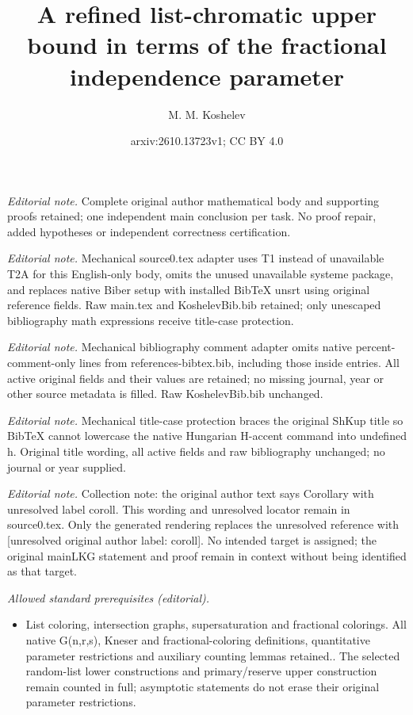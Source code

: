 \documentclass[10pt,a4paper]{article}
\title{A refined list-chromatic upper bound in terms of the fractional independence parameter}
\author{M. M. Koshelev}
\date{arxiv:2610.13723v1; CC BY 4.0}
\theoremstyle{remark}
\theoremstyle{definition}
\begin{document}
\maketitle
\noindent\textit{Editorial note.} Complete original author mathematical body and supporting proofs retained; one independent main conclusion per task. No proof repair, added hypotheses or independent correctness certification.\par\medskip
\noindent\textit{Editorial note.} Mechanical source0.tex adapter uses T1 instead of unavailable T2A for this English-only body, omits the unused unavailable systeme package, and replaces native Biber setup with installed BibTeX unsrt using original reference fields. Raw main.tex and KoshelevBib.bib retained; only unescaped bibliography math expressions receive title-case protection.\par\medskip
\noindent\textit{Editorial note.} Mechanical bibliography comment adapter omits native percent-comment-only lines from references-bibtex.bib, including those inside entries. All active original fields and their values are retained; no missing journal, year or other source metadata is filled. Raw KoshelevBib.bib unchanged.\par\medskip
\noindent\textit{Editorial note.} Mechanical title-case protection braces the original ShKup title so BibTeX cannot lowercase the native Hungarian H-accent command into undefined h. Original title wording, all active fields and raw bibliography unchanged; no journal or year supplied.\par\medskip
\noindent\textit{Editorial note.} Collection note: the original author text says Corollary with unresolved label coroll. This wording and unresolved locator remain in source0.tex. Only the generated rendering replaces the unresolved reference with [unresolved original author label: coroll]. No intended target is assigned; the original mainLKG statement and proof remain in context without being identified as that target.\par\medskip
\noindent\textit{Allowed standard prerequisites (editorial).}\begin{itemize}
\item List coloring, intersection graphs, supersaturation and fractional colorings. All native G(n,r,s), Kneser and fractional-coloring definitions, quantitative parameter restrictions and auxiliary counting lemmas retained.. The selected random-list lower constructions and primary/reserve upper construction remain counted in full; asymptotic statements do not erase their original parameter restrictions.
\end{itemize}\medskip
\end{document}
